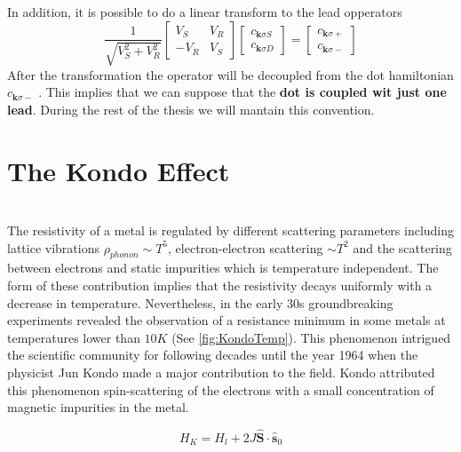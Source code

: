 In addition, it is possible to do a linear transform to the lead opperators 
\begin{equation}
    \frac{1}{\sqrt{V_{S}^{2}+V_{R}^{2}}}\left[\begin{array}{cc}
V_{S} & V_{R}\\
-V_{R} & V_{S}
\end{array}\right]\left[\begin{array}{c}
c_{\mathbf{k}\sigma S}\\
c_{\mathbf{k}\sigma D}
\end{array}\right]=\left[\begin{array}{c}
c_{\mathbf{k}\sigma+}\\
c_{\mathbf{k}\sigma-}
\end{array}\right]
\end{equation}
After the transformation the operator will be decoupled from the dot hamiltonian $c_{\mathbf{k}\sigma-}$ . This implies that we can suppose that the  \textbf{dot is coupled wit just one lead}. During the rest of the thesis we will mantain this convention. 


\section{The Kondo Effect}

\\

The resistivity of a metal is regulated by different scattering parameters including lattice vibrations $\rho_{phonon} \sim T^5$, electron-electron scattering $\sim T^2$ and the scattering between electrons and static impurities which is temperature independent. The form of these contribution implies that the resistivity decays uniformly with a decrease in temperature. Nevertheless, in the early 30s groundbreaking experiments revealed the observation of a resistance minimum in some metals at temperatures lower than $10K$ (See \ref{fig:KondoTemp}). This phenomenon intrigued the scientific community for following decades until the year 1964 when the physicist  Jun Kondo made a major contribution to the field. Kondo attributed this phenomenon spin-scattering of the electrons with a small concentration of magnetic impurities in the metal. 

\begin{equation}
H_K = H_l + 2J\hat{\textbf{S}}\cdot \hat{\textbf{s}}_0
\end{equation}

